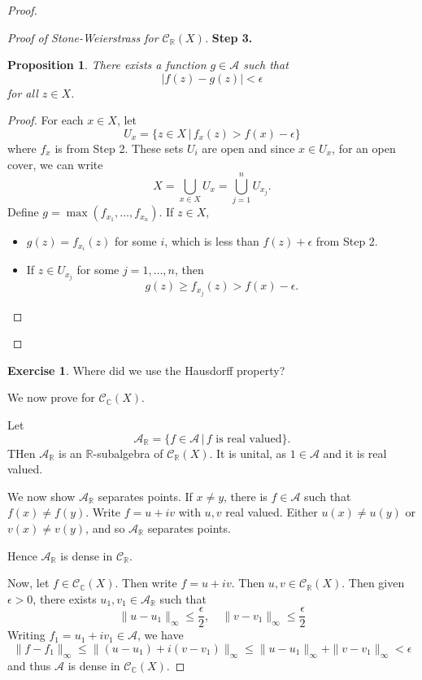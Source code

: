 \documentclass[10pt, oneside, reqno]{amsbook}
\theoremstyle{plain}%
\newtheorem{prop}[thm]{Proposition}
\theoremstyle{definition}
\newtheorem{exer}[thm]{Exercise}
\theoremstyle{remark}
\newcommand{\given}{ \, | \,}
\newcommand{\R}{\mathbb{R}}
\newcommand{\Com}{\mathbb{C}}
\begin{document}
\begin{proof}
\begin{proof}[Proof of Stone-Weierstrass for $\mathcal{C}_\R(X)$]
        \textbf{Step 3.}  \begin{prop}
            There exists a function $g \in \mathcal{A}$ such that \[
                |f(z) - g(z) | < \epsilon
            \] for all $z \in X$.  
        \end{prop}
        \begin{proof}
            For each $x \in X$, let \[
                U_x = \{ z \in X \, | \, f_x(z) > f(x) - \epsilon \} 
            \] where $f_x$ is from Step 2.  These sets $U_i$ are open and since $x \in U_x$, for an open cover, we can write \[
                X = \bigcup_{x \in X} U_x = \bigcup_{j=1}^n U_{x_j}.
            \]  
            Define $g = \max(f_{x_1}, \dots, f_{x_n})$.  If $z \in X$, 
            \begin{itemize}
                \item $g(z) = f_{x_i}(z)$ for some $i$, which is less than $f(z) + \epsilon$ from Step 2.
                \item If $z \in U_{x_j}$ for some $j = 1, \dots, n$, then \[
                    g(z) \geq f_{x_j}(z) > f(x) - \epsilon.  
                \]
            \end{itemize}
        \end{proof} 
    \end{proof}
    \begin{exer}
        Where did we use the Hausdorff property?
    \end{exer}
    
    We now prove for $\mathcal{C}_\Com(X)$.  
    
    Let \[ 
    \mathcal A_\R = \{ f \in \mathcal A \given \text{$f$ is real valued} \}. 
    \]  THen $\mathcal A_\R$ is an $\R$-subalgebra of $\mathcal C_\R(X)$.  It is unital, as $1 \in \mathcal A$ and it is real valued. 
    
    We now show $\mathcal A_\R$ separates points.  If $x \neq y$, there is $f \in \mathcal A$ such that $f(x) \neq f(y)$.  Write $f = u + iv$ with $u,v$ real valued.  Either $u(x) \neq u(y)$ or $v(x) \neq v(y)$, and so $\mathcal A_\R$ separates points.  
    
    Hence $\mathcal A_\R$ is dense in $\mathcal C_\R$.  
    
    Now, let $f \in \mathcal C_\Com(X)$.  Then write $f = u + iv$.  Then $u,v \in \mathcal C_\R(X)$.  Then given $\epsilon > 0$, there exists $u_1,v_1 \in \mathcal A_\R$ such that \[
        \| u - u_1 \|_\infty \leq \frac{\epsilon}{2}, \quad \| v - v_1 \|_\infty \leq \frac{\epsilon}{2} 
    \]  Writing $f_1 = u_1 + i v_1 \in \mathcal{A}$, we have \[
        \| f - f_1 \|_\infty \leq \| (u - u_1) + i(v-v_1) \|_\infty \leq \| u - u_1 \|_\infty + \| v - v_1 \|_\infty < \epsilon
    \] and thus $\mathcal{A}$ is dense in $\mathcal C_\Com(X)$.
\end{proof}
\end{document}
